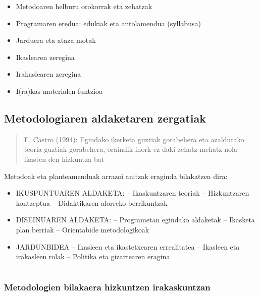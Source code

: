 \documentclass[
]{book}
\providecommand{\tightlist}{%
  \setlength{\itemsep}{0pt}\setlength{\parskip}{0pt}}
\begin{document}
\begin{itemize}
\tightlist
\item
  Metodoaren helburu orokorrak eta zehatzak
\item
  Programaren eredua: edukiak eta antolamendua (syllabusa)
\item
  Jarduera eta ataza motak
\item
  Ikaslearen zeregina
\item
  Irakaslearen zeregina
\item
  I(ra)kas-materialen funtzioa
\end{itemize}

\hypertarget{metodologiaren-aldaketaren-zergatiak}{%
\section{Metodologiaren aldaketaren zergatiak}\label{metodologiaren-aldaketaren-zergatiak}}

\begin{quote}
F. Castro (1994): Egindako ikerketa guztiak gorabehera eta azaldutako teoria guztiak gorabehera, oraindik inork ez daki zehatz-mehatz nola ikasten den hizkuntza bat
\end{quote}

Metodoak eta planteamenduak arrazoi anitzak eraginda bilakatzen dira:

\begin{itemize}
\item
  IKUSPUNTUAREN ALDAKETA:
  -- Ikaskuntzaren teoriak
  -- Hizkuntzaren kontzeptua
  -- Didaktikaren alorreko berrikuntzak
\item
  DISEINUAREN ALDAKETA:
  -- Programetan egindako aldaketak
  -- Ikasketa plan berriak
  -- Orientabide metodologikoak
\item
  JARDUNBIDEA
  -- Ikasleen eta ikastetxearen errealitatea
  -- Ikasleen eta irakasleen rolak
  -- Politika eta gizartearen eragina
\end{itemize}

\hypertarget{section-1}{%
\chapter{}\label{section-1}}

\hypertarget{metodologien-bilakaera-hizkuntzen-irakaskuntzan}{%
\subsection{Metodologien bilakaera hizkuntzen irakaskuntzan}\label{metodologien-bilakaera-hizkuntzen-irakaskuntzan}}
\end{document}
